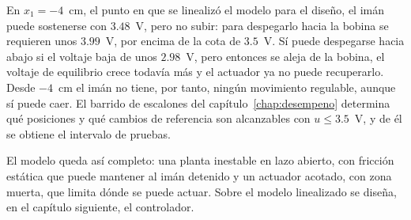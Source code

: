 En $x_1=-4$~cm, el punto en que se linealizó el modelo para el diseño, el imán puede sostenerse con $3.48$~V, pero no subir: para despegarlo hacia la bobina se requieren unos $3.99$~V, por encima de la cota de $3.5$~V. Sí puede despegarse hacia abajo si el voltaje baja de unos $2.98$~V, pero entonces se aleja de la bobina, el voltaje de equilibrio crece todavía más y el actuador ya no puede recuperarlo. Desde $-4$~cm el imán no tiene, por tanto, ningún movimiento regulable, aunque sí puede caer. El barrido de escalones del capítulo~\ref{chap:desempeno} determina qué posiciones y qué cambios de referencia son alcanzables con $u\le3.5$~V, y de él se obtiene el intervalo de pruebas.

El modelo queda así completo: una planta inestable en lazo abierto, con fricción estática que puede mantener al imán detenido y un actuador acotado, con zona muerta, que limita dónde se puede actuar. Sobre el modelo linealizado se diseña, en el capítulo siguiente, el controlador.

